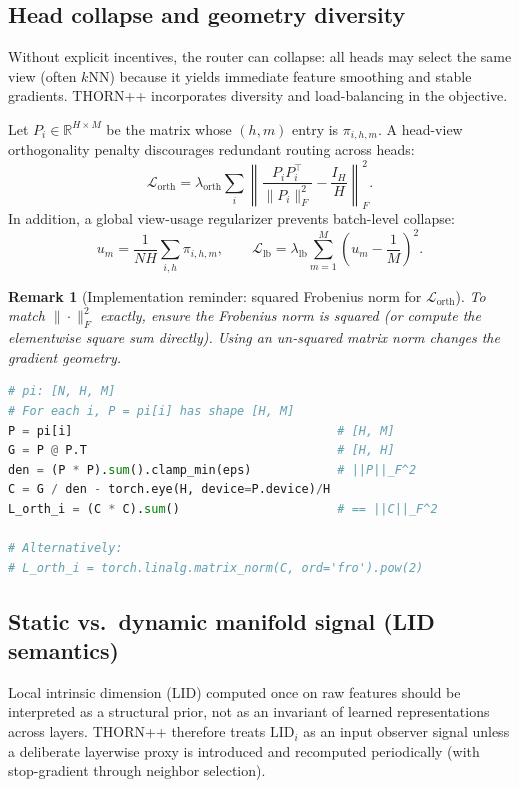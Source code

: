 \documentclass[11pt]{article}
\newtheorem{remark}{Remark}
\begin{document}
\subsection{Head collapse and geometry diversity}

Without explicit incentives, the router can collapse: all heads may select the same view (often $k$NN) because it yields immediate feature smoothing and stable gradients. THORN++ incorporates diversity and load-balancing in the objective.

Let $P_i\in\mathbb{R}^{H\times M}$ be the matrix whose $(h,m)$ entry is $\pi_{i,h,m}$. A head-view orthogonality penalty discourages redundant routing across heads:
\[
\mathcal{L}_{\text{orth}}=\lambda_{\text{orth}}\sum_i \left\lVert \frac{P_iP_i^\top}{\|P_i\|_F^2}-\frac{I_H}{H}\right\rVert_F^2.
\]
In addition, a global view-usage regularizer prevents batch-level collapse:
\[
u_m=\frac{1}{NH}\sum_{i,h}\pi_{i,h,m},
\qquad
\mathcal{L}_{\mathrm{lb}}=\lambda_{\mathrm{lb}}\sum_{m=1}^{M}\left(u_m-\frac{1}{M}\right)^2.
\]

\begin{remark}[Implementation reminder: squared Frobenius norm for $\mathcal{L}_{\mathrm{orth}}$]
To match $\|\cdot\|_F^2$ exactly, ensure the Frobenius norm is \emph{squared} (or compute the elementwise square sum directly). Using an un-squared matrix norm changes the gradient geometry.
\begin{lstlisting}[language=Python]
# pi: [N, H, M]
# For each i, P = pi[i] has shape [H, M]
P = pi[i]                                     # [H, M]
G = P @ P.T                                   # [H, H]
den = (P * P).sum().clamp_min(eps)            # ||P||_F^2
C = G / den - torch.eye(H, device=P.device)/H
L_orth_i = (C * C).sum()                      # == ||C||_F^2

# Alternatively:
# L_orth_i = torch.linalg.matrix_norm(C, ord='fro').pow(2)
\end{lstlisting}
\end{remark}

\subsection{Static vs.\ dynamic manifold signal (LID semantics)}

Local intrinsic dimension (LID) computed once on raw features should be interpreted as a structural prior, not as an invariant of learned representations across layers. THORN++ therefore treats $\mathrm{LID}_i$ as an input observer signal unless a deliberate layerwise proxy is introduced and recomputed periodically (with stop-gradient through neighbor selection).
\end{document}
